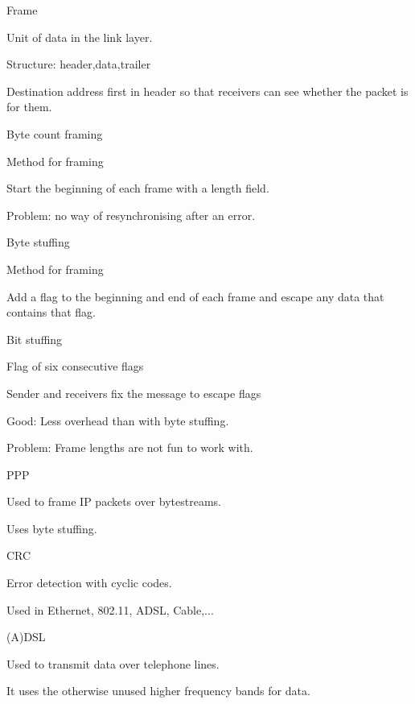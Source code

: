\documentclass[main.tex]{subfiles}
\begin{document}
\small


\begin{card}{Frame}
\item Unit of data in the link layer.
\item Structure: header,data,trailer
\item Destination address first in header so that receivers can see whether the packet is for them.
\end{card}

\begin{card}{Byte count framing}
\item Method for framing
\item Start the beginning of each frame with a length field.
\item Problem: no way of resynchronising after an error.
\end{card}

\begin{card}{Byte stuffing}
\item Method for framing
\item Add a flag to the beginning and end of each frame and escape any data that contains that flag.
\end{card}

\begin{card}{Bit stuffing}
\item Flag of six consecutive flags
\item Sender and receivers fix the message to escape flags
\item Good: Less overhead than with byte stuffing.
\item Problem: Frame lengths are not fun to work with.
\end{card}

\begin{card}{PPP}
\item Used to frame IP packets over bytestreams.
\item Uses byte stuffing.
\end{card}

\begin{card}{CRC}
\item Error detection with cyclic codes.
\item Used in Ethernet, 802.11, ADSL, Cable,...
\end{card}

\begin{card}{(A)DSL}
\item Used to transmit data over telephone lines.
\item It uses the otherwise unused higher frequency bands for data.
\end{card}
\end{document}
